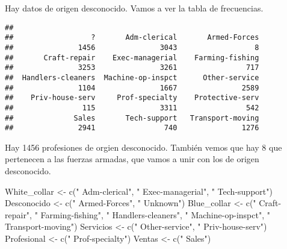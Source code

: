\documentclass[]{article}
\newenvironment{Shaded}{\begin{snugshade}}{\end{snugshade}}
\newcommand{\KeywordTok}[1]{\textcolor[rgb]{0.94,0.87,0.69}{#1}}
\newcommand{\NormalTok}[1]{\textcolor[rgb]{0.80,0.80,0.80}{#1}}
\newcommand{\OperatorTok}[1]{\textcolor[rgb]{0.94,0.94,0.82}{#1}}
\newcommand{\StringTok}[1]{\textcolor[rgb]{0.80,0.58,0.58}{#1}}
\begin{document}
Hay datos de origen desconocido. Vamos a ver la tabla de frecuencias.

\begin{Shaded}
\end{Shaded}

\begin{verbatim}
## 
##                  ?       Adm-clerical       Armed-Forces 
##               1456               3043                  8 
##       Craft-repair    Exec-managerial    Farming-fishing 
##               3253               3261                717 
##  Handlers-cleaners  Machine-op-inspct      Other-service 
##               1104               1667               2589 
##    Priv-house-serv     Prof-specialty    Protective-serv 
##                115               3311                542 
##              Sales       Tech-support   Transport-moving 
##               2941                740               1276
\end{verbatim}

Hay 1456 profesiones de orgien desconocido. También vemos que hay 8 que
pertenecen a las fuerzas armadas, que vamos a unir con los de origen
desconocido.

\begin{Shaded}
\begin{Highlighting}[]
\NormalTok{White\_collar \textless{}{-}}\StringTok{ }\KeywordTok{c}\NormalTok{(}\StringTok{" Adm{-}clerical"}\NormalTok{, }\StringTok{" Exec{-}managerial"}\NormalTok{, }\StringTok{" Tech{-}support"}\NormalTok{)}
\NormalTok{Desconocido \textless{}{-}}\StringTok{ }\KeywordTok{c}\NormalTok{(}\StringTok{" Armed{-}Forces"}\NormalTok{, }\StringTok{" Unknown"}\NormalTok{)}
\NormalTok{Blue\_collar \textless{}{-}}\StringTok{ }\KeywordTok{c}\NormalTok{(}\StringTok{" Craft{-}repair"}\NormalTok{, }\StringTok{" Farming{-}fishing"}\NormalTok{, }\StringTok{" Handlers{-}cleaners"}\NormalTok{, }\StringTok{" Machine{-}op{-}inspct"}\NormalTok{, }\StringTok{" Transport{-}moving"}\NormalTok{)}
\NormalTok{Servicios \textless{}{-}}\StringTok{ }\KeywordTok{c}\NormalTok{(}\StringTok{" Other{-}service"}\NormalTok{, }\StringTok{" Priv{-}house{-}serv"}\NormalTok{)}
\NormalTok{Profesional \textless{}{-}}\StringTok{ }\KeywordTok{c}\NormalTok{(}\StringTok{" Prof{-}specialty"}\NormalTok{)}
\NormalTok{Ventas \textless{}{-}}\StringTok{ }\KeywordTok{c}\NormalTok{(}\StringTok{" Sales"}\NormalTok{)}
\end{Highlighting}
\end{Shaded}
\end{document}
